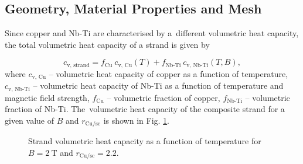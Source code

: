
\subsection{Geometry, Material Properties and Mesh}

Since copper and Nb-Ti are characterised by a~different volumetric heat capacity, the total volumetric heat capacity of a strand is given by

\begin{equation}
    c_\text{v, strand} = f_\text{Cu} ~ c_\text{v, Cu}(T) + f_\text{Nb-Ti} ~ c_\text{v, Nb-Ti}(T,B),
    \label{eqn: cv_equiv}
\end{equation}
where $c_\text{v, Cu}$ -- volumetric heat capacity of copper as a function of temperature, $c_\text{v, Nb-Ti}$ -- volumetric heat capacity of Nb-Ti as a function of temperature and magnetic field strength, $f_\text{Cu}$ -- volumetric fraction of copper, $f_\text{Nb-Ti}$ -- volumetric fraction of Nb-Ti. The~volumetric heat capacity of the composite strand for a given value of $B$ and $r_\text{Cu/sc}$ is shown in Fig. \ref{fig:eq_wind_cp}.

\begin{figure}[H]
\centering
    \caption{Strand volumetric heat capacity as a function of temperature for $B=2~\text{T}$ and $r_\text{Cu/sc}=2.2$.}
    \label{fig:eq_wind_cp}
\end{figure}

